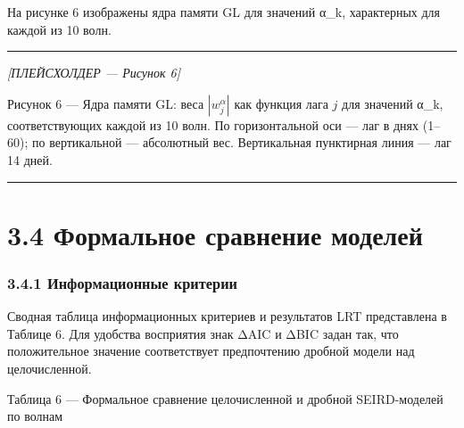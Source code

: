 \documentclass[12pt]{article}
\begin{document}
На рисунке 6 изображены ядра памяти GL для значений α\_k, характерных
для каждой из 10 волн.

\begin{center}\rule{0.5\linewidth}{0.5pt}\end{center}

\emph{{[}ПЛЕЙСХОЛДЕР --- Рисунок 6{]}}

Рисунок 6 --- Ядра памяти GL: веса \(|w_j^\alpha|\) как функция лага
\(j\) для значений α\_k, соответствующих каждой из 10 волн. По
горизонтальной оси --- лаг в днях (1--60); по вертикальной ---
абсолютный вес. Вертикальная пунктирная линия --- лаг 14 дней.

\begin{center}\rule{0.5\linewidth}{0.5pt}\end{center}

\section{3.4 Формальное сравнение
моделей}\label{ux444ux43eux440ux43cux430ux43bux44cux43dux43eux435-ux441ux440ux430ux432ux43dux435ux43dux438ux435-ux43cux43eux434ux435ux43bux435ux439}

\subsubsection{3.4.1 Информационные
критерии}\label{ux438ux43dux444ux43eux440ux43cux430ux446ux438ux43eux43dux43dux44bux435-ux43aux440ux438ux442ux435ux440ux438ux438-1}

Сводная таблица информационных критериев и результатов LRT представлена
в Таблице 6. Для удобства восприятия знак ΔAIC и ΔBIC задан так, что
положительное значение соответствует предпочтению дробной модели над
целочисленной.

Таблица 6 --- Формальное сравнение целочисленной и дробной SEIRD-моделей
по волнам
\end{document}
